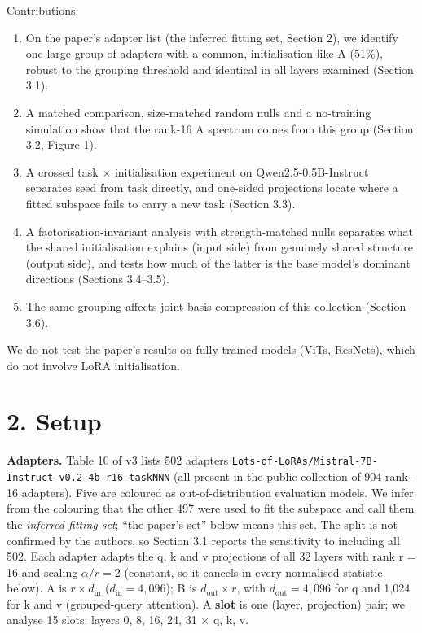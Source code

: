 \documentclass[
  11pt,
]{article}
\providecommand{\tightlist}{%
  \setlength{\itemsep}{0pt}\setlength{\parskip}{0pt}}
\begin{document}
Contributions:

\begin{enumerate}
\def\labelenumi{\arabic{enumi}.}
\tightlist
\item
  On the paper's adapter list (the inferred fitting set, Section 2), we
  identify one large group of adapters with a common,
  initialisation-like A (51\%), robust to the grouping threshold and
  identical in all layers examined (Section 3.1).
\item
  A matched comparison, size-matched random nulls and a no-training
  simulation show that the rank-16 A spectrum comes from this group
  (Section 3.2, Figure 1).
\item
  A crossed task \texorpdfstring{\ensuremath{\times}}{x} initialisation experiment on Qwen2.5-0.5B-Instruct
  separates seed from task directly, and one-sided projections locate
  where a fitted subspace fails to carry a new task (Section 3.3).
\item
  A factorisation-invariant analysis with strength-matched nulls
  separates what the shared initialisation explains (input side) from
  genuinely shared structure (output side), and tests how much of the
  latter is the base model's dominant directions (Sections 3.4--3.5).
\item
  The same grouping affects joint-basis compression of this collection
  (Section 3.6).
\end{enumerate}

We do not test the paper's results on fully trained models (ViTs,
ResNets), which do not involve LoRA initialisation.

\section{2. Setup}\label{setup}

\textbf{Adapters.} Table 10 of v3 lists 502 adapters
\texttt{Lots-\allowbreak{}of-\allowbreak{}LoRAs/\allowbreak{}Mistral-\allowbreak{}7B-\allowbreak{}Instruct-\allowbreak{}v0.2-\allowbreak{}4b-\allowbreak{}r16-\allowbreak{}taskNNN} (all
present in the public collection of 904 rank-16 adapters). Five are
coloured as out-of-distribution evaluation models. We infer from the
colouring that the other 497 were used to fit the subspace and call them
the \emph{inferred fitting set}; ``the paper's set'' below means this
set. The split is not confirmed by the authors, so Section 3.1 reports
the sensitivity to including all 502. Each adapter adapts the q, k and v
projections of all 32 layers with rank r = 16 and scaling
\(\alpha/r = 2\) (constant, so it cancels in every normalised statistic
below). A is \(r \times d_{\text{in}}\) (\(d_{\text{in}} = 4{,}096\)); B
is \(d_{\text{out}} \times r\), with \(d_{\text{out}} = 4{,}096\) for q
and 1,024 for k and v (grouped-query attention). A \textbf{slot} is one
(layer, projection) pair; we analyse 15 slots: layers 0, 8, 16, 24, 31 \texorpdfstring{\ensuremath{\times}}{x}
q, k, v.
\end{document}
